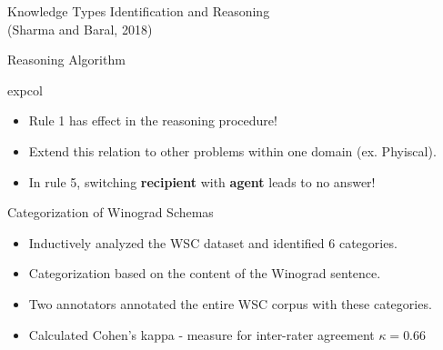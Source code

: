 \documentclass[svgnames, final, 20pt]{beamer} %
\begin{document}
\begin{frame}[fragile]
\begin{columns}[t]
\begin{block}{Knowledge Types Identification and Reasoning\\(Sharma and Baral, 2018)}
\begin{block}{Reasoning Algorithm}
\begin{beamercolorbox}[rounded=true,sep=0.3cm]{expcol}
\end{beamercolorbox}

\begin{itemize}
	\item Rule 1 {\color{myorange}has effect} in the reasoning procedure!
	\item Extend this relation to other problems within one domain (ex. Phyiscal).
	\item In rule 5, switching \textbf{recipient} with \textbf{agent} leads to no answer!
\end{itemize}

\end{block}
\vspace{-0.6cm}

\begin{block}{Categorization of Winograd Schemas}
\justify 
\begin{itemize}
	\item Inductively analyzed the WSC dataset and identified {\color{myorange}6 categories}.
	\item Categorization based on the {\color{myorange}content} of the Winograd sentence.
	\item Two annotators annotated the entire WSC corpus with these categories.
	\item Calculated Cohen's kappa - measure for inter-rater agreement $\kappa=0.66$
\end{itemize}
 
\vspace{1cm}
\end{block}
\end{block}
\end{columns}
\end{frame}
\end{document}
